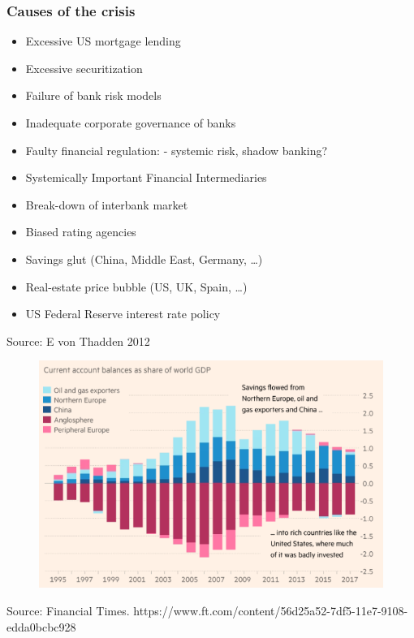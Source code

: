 \documentclass[11pt]{beamer}
\begin{document}
\begin{frame}
\frametitle{Causes of the crisis}
\begin{itemize}
\item Excessive US mortgage lending
\item Excessive securitization
\item Failure of bank risk models
\item Inadequate corporate governance of banks
\item Faulty financial regulation: - systemic risk, shadow banking?
\item Systemically Important Financial Intermediaries
\item Break-down of interbank market
\item Biased rating agencies
\item Savings glut (China, Middle East, Germany, …)
\item Real-estate price bubble (US, UK, Spain, …)
\item US Federal Reserve interest rate policy
\end{itemize}

\tiny{Source: E von Thadden 2012}

\end{frame}


\begin{frame}
\begin{figure}
\includegraphics[width=1\textwidth]{SavingsGlut.png}
\end{figure}
\tiny{Source: Financial Times. https://www.ft.com/content/56d25a52-7df5-11e7-9108-edda0bcbc928}
\end{frame}
\end{document}
